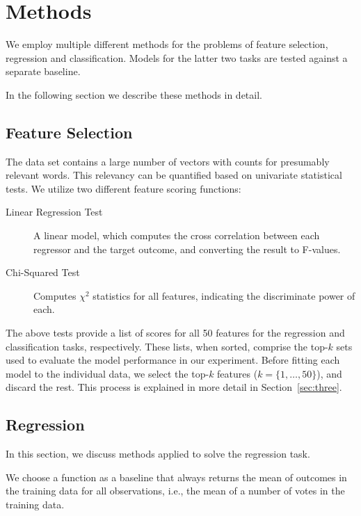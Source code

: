 \section{Methods}
\label{sec:two}

We employ multiple different methods for the problems of feature selection,
regression and classification.  Models for the latter two tasks are tested
against a separate baseline.

In the following section we describe these methods in detail.

\subsection{Feature Selection}

The data set contains a large number of vectors with counts for presumably
relevant words.  This relevancy can be quantified based on univariate
statistical tests.  We utilize two different feature scoring functions:

\begin{description}
\item[Linear Regression Test] A linear model, which computes the cross correlation
  between each regressor and the target outcome, and converting the result to
  F-values.
\item[Chi-Squared Test] Computes $\chi^2$ statistics for all features,
  indicating the discriminate power of each.
\end{description}

The above tests provide a list of scores for all 50 features for the regression
and classification tasks, respectively.  These lists, when sorted, comprise the
top-$k$ sets used to evaluate the model performance in our experiment.  Before
fitting each model to the individual data, we select the top-$k$ features ($k =
\{1, \ldots, 50\}$), and discard the rest.  This process is explained in more
detail in Section~\ref{sec:three}.

\subsection{Regression}

In this section, we discuss methods applied to solve the regression task.

We choose a function as a baseline that always returns the mean of outcomes in
the training data for all observations, i.e., the mean of a number of votes in
the training data.

